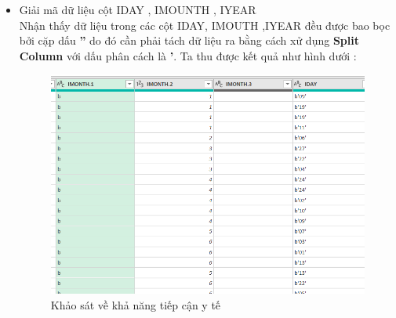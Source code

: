 \begin{itemize}
    \item Giải mã dữ liệu cột IDAY , IMOUNTH , IYEAR \\\hfill
    Nhận thấy dữ liệu trong các cột IDAY, IMOUTH ,IYEAR đều được bao bọc bởi cặp dấu \textbf{''} do đó cần phải tách dữ liệu ra bằng cách xử dụng \textbf{Split Column } với dấu phân cách là \textbf{'}. Ta thu được kết quả như hình dưới :
    
            \begin{figure}[!h]
                \begin{center}
                \includegraphics[scale = 0.8]{HONG/2.png}
              \caption{Khảo sát về khả năng tiếp cận y tế}
         

\end{center}
\end{figure}
\end{itemize}
